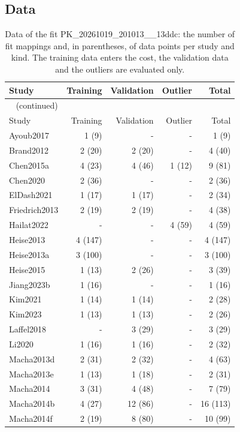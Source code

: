 \documentclass{article}
\begin{document}
\subsection{Data}

\begin{longtable}{lrrrr}
\caption{Data of the fit PK\_20261019\_201013\_\_13ddc: the number of fit mappings and, in parentheses, of data points per study and kind. The training data enters the cost, the validation data and the outliers are evaluated only.}\label{tab:data:PK_20261019_201013__13ddc} \\
\toprule
Study & Training & Validation & Outlier & Total \\
\midrule
\endfirsthead
\multicolumn{5}{l}{\small\tablename~\thetable{} (continued)} \\
\toprule
Study & Training & Validation & Outlier & Total \\
\midrule
\endhead
\bottomrule
\endlastfoot
Ayoub2017 & 1 (9) & - & - & 1 (9) \\
Brand2012 & 2 (20) & 2 (20) & - & 4 (40) \\
Chen2015a & 4 (23) & 4 (46) & 1 (12) & 9 (81) \\
Chen2020 & 2 (36) & - & - & 2 (36) \\
ElDash2021 & 1 (17) & 1 (17) & - & 2 (34) \\
Friedrich2013 & 2 (19) & 2 (19) & - & 4 (38) \\
Hailat2022 & - & - & 4 (59) & 4 (59) \\
Heise2013 & 4 (147) & - & - & 4 (147) \\
Heise2013a & 3 (100) & - & - & 3 (100) \\
Heise2015 & 1 (13) & 2 (26) & - & 3 (39) \\
Jiang2023b & 1 (16) & - & - & 1 (16) \\
Kim2021 & 1 (14) & 1 (14) & - & 2 (28) \\
Kim2023 & 1 (13) & 1 (13) & - & 2 (26) \\
Laffel2018 & - & 3 (29) & - & 3 (29) \\
Li2020 & 1 (16) & 1 (16) & - & 2 (32) \\
Macha2013d & 2 (31) & 2 (32) & - & 4 (63) \\
Macha2013e & 1 (13) & 1 (18) & - & 2 (31) \\
Macha2014 & 3 (31) & 4 (48) & - & 7 (79) \\
Macha2014b & 4 (27) & 12 (86) & - & 16 (113) \\
Macha2014f & 2 (19) & 8 (80) & - & 10 (99) \\

\end{longtable}
\end{document}
